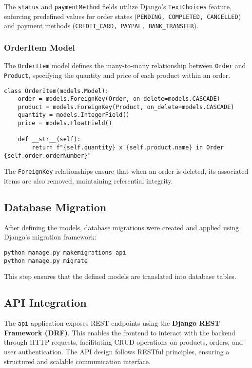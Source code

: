 The \texttt{status} and \texttt{paymentMethod} fields utilize Django's \texttt{TextChoices} feature, enforcing predefined values for order states (\texttt{PENDING, COMPLETED, CANCELLED}) and payment methods (\texttt{CREDIT\_CARD, PAYPAL, BANK\_TRANSFER}).

\subsubsection{OrderItem Model}
The \texttt{OrderItem} model defines the many-to-many relationship between \texttt{Order} and \texttt{Product}, specifying the quantity and price of each product within an order.

\begin{verbatim}
class OrderItem(models.Model):
    order = models.ForeignKey(Order, on_delete=models.CASCADE)
    product = models.ForeignKey(Product, on_delete=models.CASCADE)
    quantity = models.IntegerField()
    price = models.FloatField()

    def __str__(self):
        return f"{self.quantity} x {self.product.name} in Order {self.order.orderNumber}"
\end{verbatim}

The \texttt{ForeignKey} relationships ensure that when an order is deleted, its associated items are also removed, maintaining referential integrity.

\subsection{Database Migration}
After defining the models, database migrations were created and applied using Django's migration framework:

\begin{verbatim}
python manage.py makemigrations api
python manage.py migrate
\end{verbatim}

This step ensures that the defined models are translated into database tables.

\subsection{API Integration}
The \texttt{api} application exposes REST endpoints using the \textbf{Django REST Framework (DRF)}. This enables the frontend to interact with the backend through HTTP requests, facilitating CRUD operations on products, orders, and user authentication. The API design follows RESTful principles, ensuring a structured and scalable communication interface.

